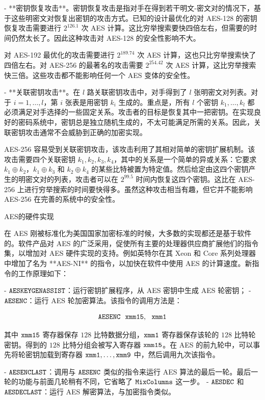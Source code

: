 - **密钥恢复攻击**。密钥恢复攻击是指对手在得到若干明文-密文对的情况下，基于这些明密文对恢复出密钥的攻击方式。已知的设计最优化的对 AES-128 的密钥恢复攻击需要进行 $2^{126.1}$ 次 AES 计算。这比穷举搜索要快四倍左右，但需要的时间仍然太长了。因此这种攻击对 AES-128 的安全性影响不大。
    
    对 AES-192 最优化的攻击需要进行 $2^{189.74}$ 次 AES 计算，这也只比穷举搜索快了四倍左右。对 AES-256 的最著名的攻击需要 $2^{254.42}$ 次 AES 计算，这比穷举搜索快三倍。这些攻击都不能影响任何一个 AES 变体的安全性。
    
- **关联密钥攻击**。在 $l$ 路关联密钥攻击中，对手得到了 $l$ 张明密文对列表。对于 $i=1,\dots,l$，第 $i$ 张表是用密钥 $k_i$ 生成的。重点是，所有 $l$ 个密钥 $k_1,\dots,k_l$ 都必须满足对手选择的一些固定关系。攻击者的目标是恢复其中一把密钥。在实现良好的密码系统中，密钥总是独立随机生成的，不太可能满足所需的关系。因此，关联密钥攻击通常不会威胁到正确的加密实现。
    
    AES-256 容易受到关联密钥攻击，该攻击利用了其相对简单的密钥扩展机制。该攻击需要四个关联密钥 $k_1,k_2,k_3,k_4$，其中的关系是一个简单的异或关系：它要求 $k_1\oplus k_2$，$k_1\oplus k_3$ 和 $k_2\oplus k_4$ 的某些比特被置为特定值。然后给定由这四个密钥产生的明密文对的列表，攻击者可以在 $2^{99.5}$ 时间内恢复这四个密钥。这比在 AES-256 上进行穷举搜索的时间要快得多。虽然这种攻击相当有趣，但它并不能影响 AES-256 在完善的系统中的安全性。
    
AES的硬件实现

在 AES 刚被标准化为美国国家加密标准的时候，大多数的实现都还是基于软件的。软件产品对 AES 的广泛采用，促使所有主要的处理器供应商扩展他们的指令集，以增加对 AES 硬件实现的支持。例如英特尔在其 Xeon 和 Core 系列处理器中增加了名为 **AES-NI** 的指令，以加快在软件中使用 AES 的计算速度。新指令的工作原理如下：

- $\tt{AESKEYGENASSIST}$：运行密钥扩展程序，从 AES 密钥中生成 AES 轮密钥；
- $\tt{AESENC}$：运行 AES 轮加密算法。该指令的调用方法是：
    
    $$
    \tt{AESENC~~xmm15,~~xmm1}
    $$
    
    其中 $\tt xmm15$ 寄存器保存 $128$ 比特数据分组，$\tt xmm1$ 寄存器保存该轮的 $128$ 比特轮密钥。得到的 $128$ 比特分组会被写入寄存器 $\tt xmm15$。在 AES 的前九轮中，可以事先将轮密钥加载到寄存器 $\tt{xmm1,\dots,xmm9}$ 中，然后调用九次该指令。
    
- $\tt AESENCLAST$：调用与 $\tt AESENC$ 类似的指令来运行 AES 算法的最后一轮。最后一轮的功能与前面几轮稍有不同，它省略了 $\tt MixColumns$ 这一步。
- $\tt AESDEC$ 和 $\tt AESDECLAST$：运行 AES 解密算法，与加密指令类似。

